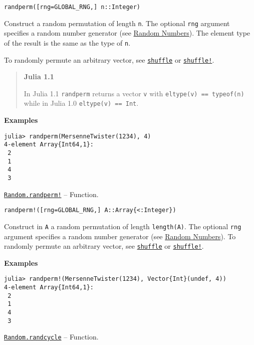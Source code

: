 \begin{adjustwidth}{2em}{0pt}


\begin{verbatim}
randperm([rng=GLOBAL_RNG,] n::Integer)
\end{verbatim}

Construct a random permutation of length \texttt{n}. The optional \texttt{rng} argument specifies a random number generator (see \href{@ref}{Random Numbers}). The element type of the result is the same as the type of \texttt{n}.

To randomly permute an arbitrary vector, see \hyperlink{16742615893822221762}{\texttt{shuffle}} or \hyperlink{15315300334019616632}{\texttt{shuffle!}}.

\begin{quote}
\textbf{Julia 1.1}

In Julia 1.1 \texttt{randperm} returns a vector \texttt{v} with \texttt{eltype(v) == typeof(n)} while in Julia 1.0 \texttt{eltype(v) == Int}.

\end{quote}
\textbf{Examples}


\begin{verbatim}
julia> randperm(MersenneTwister(1234), 4)
4-element Array{Int64,1}:
 2
 1
 4
 3
\end{verbatim}



\end{adjustwidth}
\hypertarget{9956290992837499502}{} 
\hyperlink{9956290992837499502}{\texttt{Random.randperm!}}  -- {Function.}

\begin{adjustwidth}{2em}{0pt}


\begin{verbatim}
randperm!([rng=GLOBAL_RNG,] A::Array{<:Integer})
\end{verbatim}

Construct in \texttt{A} a random permutation of length \texttt{length(A)}. The optional \texttt{rng} argument specifies a random number generator (see \href{@ref}{Random Numbers}). To randomly permute an arbitrary vector, see \hyperlink{16742615893822221762}{\texttt{shuffle}} or \hyperlink{15315300334019616632}{\texttt{shuffle!}}.

\textbf{Examples}


\begin{verbatim}
julia> randperm!(MersenneTwister(1234), Vector{Int}(undef, 4))
4-element Array{Int64,1}:
 2
 1
 4
 3
\end{verbatim}



\end{adjustwidth}
\hypertarget{8716855906711617057}{} 
\hyperlink{8716855906711617057}{\texttt{Random.randcycle}}  -- {Function.}

